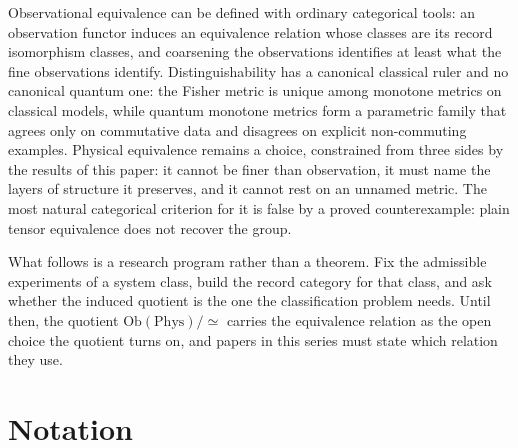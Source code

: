 \documentclass[11pt,letterpaper]{article}
\theoremstyle{definition}
\theoremstyle{remark}
\begin{document}
Observational equivalence can be defined with ordinary categorical tools: an observation functor induces an equivalence relation whose classes are its record isomorphism classes, and coarsening the observations identifies at least what the fine observations identify. Distinguishability has a canonical classical ruler and no canonical quantum one: the Fisher metric is unique among monotone metrics on classical models, while quantum monotone metrics form a parametric family that agrees only on commutative data and disagrees on explicit non-commuting examples. Physical equivalence remains a choice, constrained from three sides by the results of this paper: it cannot be finer than observation, it must name the layers of structure it preserves, and it cannot rest on an unnamed metric. The most natural categorical criterion for it is false by a proved counterexample: plain tensor equivalence does not recover the group.

What follows is a research program rather than a theorem. Fix the admissible experiments of a system class, build the record category for that class, and ask whether the induced quotient is the one the classification problem needs. Until then, the quotient $\mathrm{Ob}(\mathrm{Phys})/{\simeq}$ carries the equivalence relation as the open choice the quotient turns on, and papers in this series must state which relation they use.

\section*{Notation}
\end{document}
